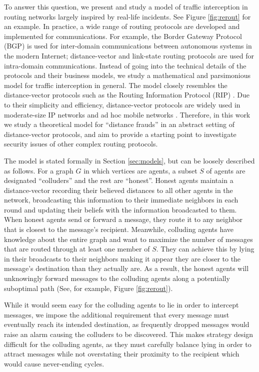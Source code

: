\documentclass{comnet}
\begin{document}
To answer this question, we present and study a model of traffic interception
in routing networks largely inspired by real-life incidents. See Figure
\ref{fig:rerout} for an example. In practice, a wide range of routing protocols
are developed and implemented for communications. For example, the Border
Gateway Protocol (BGP) is used for inter-domain communications between
autonomous systems in the modern Internet; distance-vector and link-state
routing protocols are used for intra-domain communications. Instead of going
into the technical details of the protocols and their business models, we study
a mathematical and parsimonious model for traffic interception in general. The
model closely resembles the distance-vector protocols such as the Routing
Information Protocol (RIP) \cite{Hedrick, Malkin}. Due to their simplicity and
efficiency, distance-vector protocols are widely used in moderate-size IP
networks and ad hoc mobile networks \cite{Hu2003175, 579225}. Therefore, in
this work we study a theoretical model for ``distance frauds'' \cite{1039858}
in an abstract setting of distance-vector protocols, and aim to provide a
starting point to investigate security issues of other complex routing
protocols. 

The model is stated formally in Section \ref{sec:models}, but can be loosely
described as follows. For a graph $G$ in which vertices are agents, a subset
$S$ of agents are designated ``colluders'' and the rest are ``honest''. Honest
agents maintain a distance-vector recording their believed distances to all
other agents in the network, broadcasting this information to their immediate
neighbors in each round and updating their beliefs with the information
broadcasted to them.  When honest agents send or forward a message, they route
it to any neighbor that is closest to the message's recipient. Meanwhile,
colluding agents have knowledge about the entire graph and want to maximize the
number of messages that are routed through at least one member of $S$. They can
achieve this by lying in their broadcasts to their neighbors making it appear
they are closer to the message's destination than they actually are. As a
result, the honest agents will unknowingly forward messages to the colluding
agents along a potentially suboptimal path (See, for example, Figure
\ref{fig:rerout}).

While it would seem easy for the colluding agents to lie in order to intercept
messages, we impose the additional requirement that every message must
eventually reach its intended destination, as frequently dropped messages would
raise an alarm causing the colluders to be discovered. This makes strategy
design difficult for the colluding agents, as they must carefully balance lying
in order to attract messages while not overstating their proximity to the
recipient which would cause never-ending cycles. 
\end{document}
